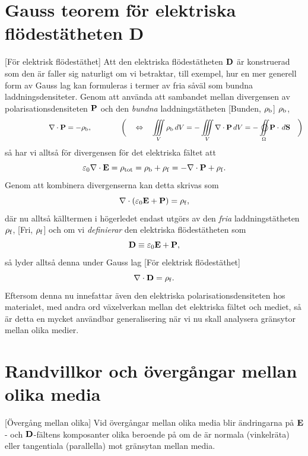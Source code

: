 {\section{Gauss teorem f{\"o}r elektriska fl{\"o}dest{\"a}theten {\bf D}}
[F{\"o}r elektrisk fl{\"o}dest{\"a}thet]
Att den elektriska fl{\"o}dest{\"a}theten ${\bf D}$
 {\"a}r konstruerad som den
{\"a}r faller sig naturligt om vi betraktar, till exempel, hur en mer generell
form av Gauss lag kan formuleras i termer av fria s{\aa}v{\"a}l som bundna
laddningsdensiteter.
Genom att anv{\"a}nda att sambandet mellan divergensen av
polarisationsdensiteten ${\bf P}$  och
den {\it bundna} laddningst{\"a}theten 
[Bunden, $\rho_{\rm b}$]
$\rho_{\rm b}$,
$$
  \qquad
  \qquad
  \qquad
  \nabla\cdot{\bf P} = -\rho_{\rm b},
  \qquad\qquad
  \bigg(\quad\Leftrightarrow\quad
  \iiint_V \rho_{\rm b}\,dV
    = -\iiint_V\nabla\cdot{\bf P}\,dV
    = -\oiint_{\Omega}{\bf P}\cdot\,d{\bf S}
    \quad\bigg)
$$
s{\aa} har vi allts{\aa} f{\"o}r divergensen f{\"o}r det elektriska f{\"a}ltet
att
$$
  \varepsilon_0\nabla\cdot{\bf E}
    =\rho_{\rm tot}
    =\rho_{\rm b}+\rho_{\rm f}
    =-\nabla\cdot{\bf P}+\rho_{\rm f}.
$$
Genom att kombinera divergenserna kan detta skrivas som
$$
  \nabla\cdot(\varepsilon_0{\bf E}+{\bf P})=\rho_{\rm f},
$$
d{\"a}r nu allts{\aa} k{\"a}lltermen i h{\"o}gerledet endast utg{\"o}rs av den
{\it fria} laddningst{\"a}theten $\rho_{\rm f}$,
[Fri, $\rho_{\rm f}$]
och om vi {\it definierar} den elektriska fl{\"o}dest{\"a}theten som
$$
  {\bf D}\equiv\varepsilon_0{\bf E}+{\bf P},
$$
s{\aa} lyder allts{\aa} denna under Gauss lag
[F{\"o}r elektrisk fl{\"o}dest{\"a}thet]
$$
  \nabla\cdot{\bf D}=\rho_{\rm f}.
$$
Eftersom denna nu innefattar {\"a}ven den elektriska polarisationsdensiteten
 hos materialet, med andra ord
v{\"a}xelverkan mellan det elektriska f{\"a}ltet och mediet, s{\aa} {\"a}r
detta en mycket anv{\"a}ndbar generalisering n{\"a}r vi nu skall analysera
gr{\"a}nsytor mellan olika medier.
\vfill\eject

\section{Randvillkor och {\"o}verg{\aa}ngar mellan olika media}
[{\"O}verg{\aa}ng mellan olika]
Vid {\"o}verg{\aa}ngar mellan olika media blir {\"a}ndringarna p{\aa}
${\bf E}$- och ${\bf D}$-f{\"a}ltens komposanter olika bero\-ende p{\aa} om
de {\"a}r  normala (vinkelr{\"a}ta) eller tangentiala (parallella) mot
gr{\"a}nsytan mellan media.

}
